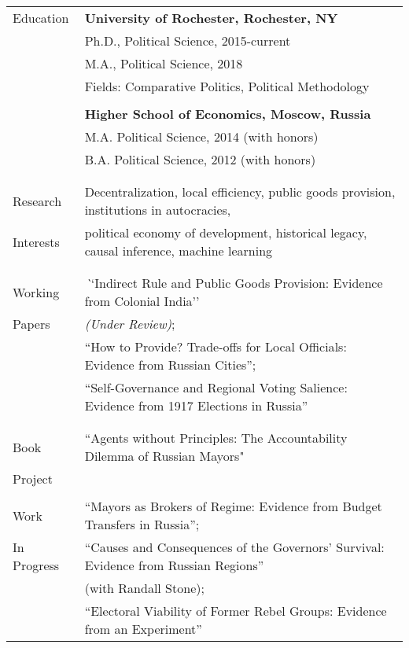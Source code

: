 \documentclass[letterpaper,11pt,oneside]{article}
\begin{document}
\noindent \begin{tabular}{@{} l l}
 \Large{Education}    & \textbf{University of Rochester, Rochester, NY} \\
     & Ph.D., Political Science, 2015-current \\
     & M.A., Political Science, 2018 \\
     & Fields: Comparative Politics, Political Methodology \\
     \vspace*{-2mm}
     & \\
     & \textbf{Higher School of Economics, Moscow, Russia} \\
     & M.A. Political Science, 2014 (with honors) \\
     & B.A. Political Science, 2012 (with honors) \\
     & \\
&\\
\Large{Research} & Decentralization, local efficiency, public goods provision,  institutions in autocracies,  \\
\Large{Interests} &political economy of development, historical legacy, causal inference, machine learning\\
 & \\
&\\
\Large{Working}
 & \textit``Indirect Rule and Public Goods Provision: Evidence from Colonial  India''\\
 \Large{Papers}& \textit{(Under Review)};\\
 & ``How to Provide? Trade-offs for Local Officials: Evidence from Russian Cities'';\\
 &   ``Self-Governance and Regional Voting Salience: Evidence from 1917 Elections in Russia''\\
  & \\
 &\\
 \Large{Book}
 & ``Agents without Principles: The Accountability Dilemma of Russian Mayors" \\
 \Large{Project} 
  & \\
 &\\
 \Large{Work}
 & ``Mayors as Brokers of Regime: Evidence from Budget Transfers in Russia'';\\
  \Large{In Progress} &``Causes and Consequences of the Governors' Survival: Evidence from Russian Regions''\\
  & (with Randall Stone);\\
   & ``Electoral Viability of Former Rebel Groups: Evidence from an Experiment''\\

\end{tabular}
\end{document}
